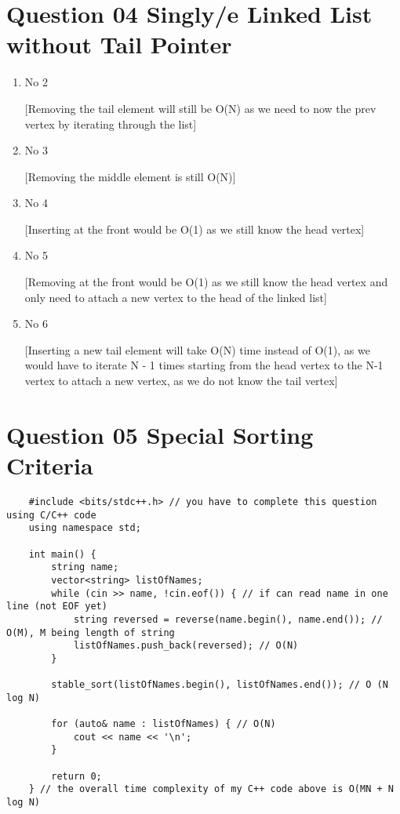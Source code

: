 \documentclass{article}
\begin{document}
\section{Question 04 Singly/e Linked List without Tail Pointer}
\begin{enumerate}[label=(\arabic*)]

\item No 2

[Removing the tail element will still be O(N) as we need to now the prev vertex by iterating through the list]

\item No 3

[Removing the middle element is still O(N)]

\item No 4

[Inserting at the front would be O(1) as we still know the head vertex]

\item No 5

[Removing at the front would be O(1) as we still know the head vertex and only need to attach a new vertex to the head of the linked list]

\item No 6

[Inserting a new tail element will take O(N) time instead of O(1), as we would have to iterate N - 1 times starting from the head vertex to the N-1 vertex to attach a new vertex, as we do not know the tail vertex]

\end{enumerate}

\section{Question 05 Special Sorting Criteria}

\begin{verbatim}
    #include <bits/stdc++.h> // you have to complete this question using C/C++ code
    using namespace std;
    
    int main() {
        string name;
        vector<string> listOfNames;
        while (cin >> name, !cin.eof()) { // if can read name in one line (not EOF yet)
            string reversed = reverse(name.begin(), name.end()); // O(M), M being length of string
            listOfNames.push_back(reversed); // O(N)
        }
        
        stable_sort(listOfNames.begin(), listOfNames.end()); // O (N log N)
        
        for (auto& name : listOfNames) { // O(N)
            cout << name << '\n';
        }
        
        return 0;
    } // the overall time complexity of my C++ code above is O(MN + N log N)
\end{verbatim}
\end{document}
